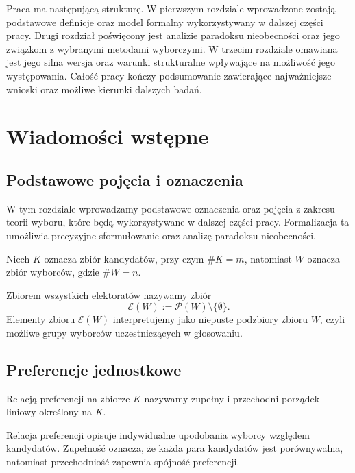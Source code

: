 \documentclass[12pt,a4paper]{mwrep}
\begin{document}
	Praca ma następującą strukturę. W pierwszym rozdziale wprowadzone zostają podstawowe definicje oraz model formalny wykorzystywany w dalszej części pracy. Drugi rozdział poświęcony jest analizie paradoksu nieobecności oraz jego związkom z wybranymi metodami wyborczymi. W trzecim rozdziale omawiana jest jego silna wersja oraz warunki strukturalne wpływające na możliwość jego występowania. Całość pracy kończy podsumowanie zawierające najważniejsze wnioski oraz możliwe kierunki dalszych badań.
	
	\newpage
	
	\chapter{Wiadomości wstępne}
	
	\section{Podstawowe pojęcia i oznaczenia}
	
	W tym rozdziale wprowadzamy podstawowe oznaczenia oraz pojęcia z zakresu teorii wyboru, które będą wykorzystywane w dalszej części pracy. Formalizacja ta umożliwia precyzyjne sformułowanie oraz analizę paradoksu nieobecności.
	
	Niech \(K\) oznacza zbiór kandydatów, przy czym \(\#K = m\), natomiast \(W\) oznacza zbiór wyborców, gdzie \(\#W = n\).
	
	\begin{definition}[elektorat]
		\label{def:elektorat}
		Zbiorem wszystkich elektoratów nazywamy zbiór
		\[
		\mathcal{E}(W) := \mathcal{P}(W) \setminus \{\emptyset\}.
		\]
		Elementy zbioru \(\mathcal{E}(W)\) interpretujemy jako niepuste podzbiory zbioru \(W\), czyli możliwe grupy wyborców uczestniczących w głosowaniu.
	\end{definition}
	
	\section{Preferencje jednostkowe}
	
	\begin{definition}
		\label{def:relacja-preferencji}
		Relacją preferencji na zbiorze \(K\) nazywamy zupełny i przechodni porządek liniowy określony na \(K\).
	\end{definition}
	
	Relacja preferencji opisuje indywidualne upodobania wyborcy względem kandydatów. Zupełność oznacza, że każda para kandydatów jest porównywalna, natomiast przechodniość zapewnia spójność preferencji.
	
\end{document}

